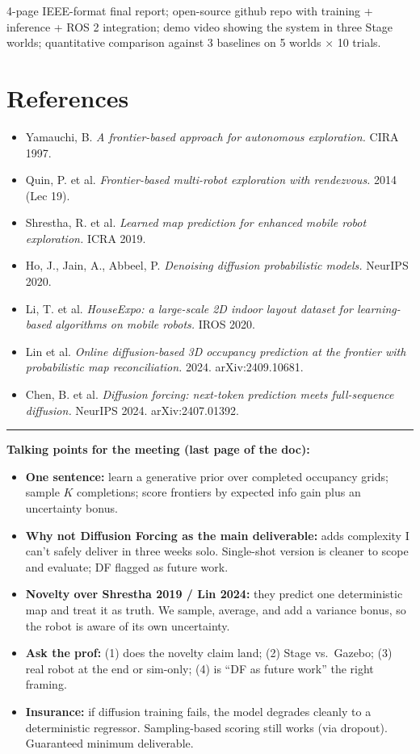 \documentclass[11pt]{article}
\begin{document}
4-page IEEE-format final report; open-source github repo with training + inference + ROS 2 integration; demo video showing the system in three Stage worlds; quantitative comparison against 3 baselines on 5 worlds $\times$ 10 trials.

\section{References}

\begin{itemize}[itemsep=0pt,topsep=0pt,leftmargin=*]
\item Yamauchi, B. \textit{A frontier-based approach for autonomous exploration.} CIRA 1997.
\item Quin, P. et al. \textit{Frontier-based multi-robot exploration with rendezvous.} 2014 (Lec 19).
\item Shrestha, R. et al. \textit{Learned map prediction for enhanced mobile robot exploration.} ICRA 2019.
\item Ho, J., Jain, A., Abbeel, P. \textit{Denoising diffusion probabilistic models.} NeurIPS 2020.
\item Li, T. et al. \textit{HouseExpo: a large-scale 2D indoor layout dataset for learning-based algorithms on mobile robots.} IROS 2020.
\item Lin et al. \textit{Online diffusion-based 3D occupancy prediction at the frontier with probabilistic map reconciliation.} 2024. arXiv:2409.10681.
\item Chen, B. et al. \textit{Diffusion forcing: next-token prediction meets full-sequence diffusion.} NeurIPS 2024. arXiv:2407.01392.
\end{itemize}

\vfill
\hrule
\medskip
\noindent\textbf{Talking points for the meeting (last page of the doc):}
\begin{itemize}[itemsep=0pt,topsep=0pt,leftmargin=*]
\item \textbf{One sentence:} learn a generative prior over completed occupancy grids; sample $K$ completions; score frontiers by expected info gain plus an uncertainty bonus.
\item \textbf{Why not Diffusion Forcing as the main deliverable:} adds complexity I can't safely deliver in three weeks solo. Single-shot version is cleaner to scope and evaluate; DF flagged as future work.
\item \textbf{Novelty over Shrestha 2019 / Lin 2024:} they predict one deterministic map and treat it as truth. We sample, average, and add a variance bonus, so the robot is aware of its own uncertainty.
\item \textbf{Ask the prof:} (1) does the novelty claim land; (2) Stage vs.\ Gazebo; (3) real robot at the end or sim-only; (4) is ``DF as future work'' the right framing.
\item \textbf{Insurance:} if diffusion training fails, the model degrades cleanly to a deterministic regressor. Sampling-based scoring still works (via dropout). Guaranteed minimum deliverable.
\end{itemize}
\end{document}
